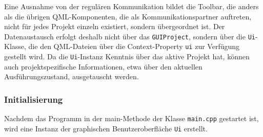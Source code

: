 Eine Ausnahme von der regulären Kommunikation bildet die Toolbar, die anders als die übrigen QML-Komponenten, die als Kommunikationspartner auftreten, nicht für jedes Projekt einzeln existiert, sondern übergeordnet ist. Der Datenaustausch erfolgt deshalb nicht über das \texttt{GUIProject}, sondern über die \texttt{Ui}-Klasse, die den QML-Dateien über die Context-Property \texttt{ui} zur Verfügung gestellt wird. Da die \texttt{Ui}-Instanz Kenntnis über das aktive Projekt hat, können auch projektspezifische Informationen, etwa über den aktuellen Ausführungszustand, ausgetauscht werden.


\subsubsection{Initialisierung}

Nachdem das Programm in der main-Methode der Klasse \texttt{main.cpp} gestartet ist, wird eine Instanz der graphischen Benutzeroberfläche \texttt{Ui} erstellt.
